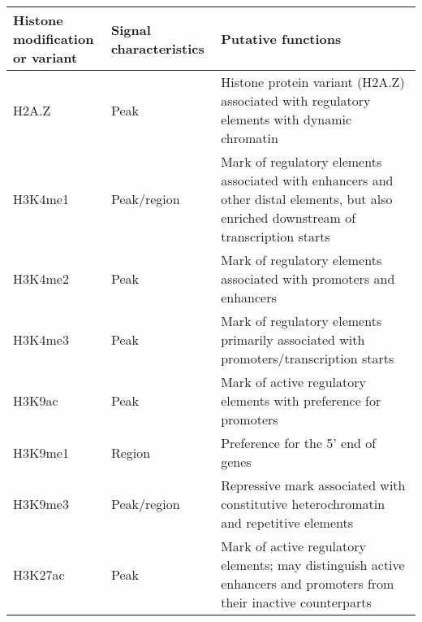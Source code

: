 \begin{table}[h]
   \footnotesize
   \begin{tabular}{l l p{5cm}}
\pbox[b]{20cm}{ \textbf{Histone modification} \\ \textbf{or variant} } & \textbf{Signal characteristics} & \textbf{Putative functions}                                                                                         \\ \hline
H2A.Z                           & Peak                   & Histone protein variant (H2A.Z) associated with regulatory elements with dynamic chromatin                                            \\ \hline
H3K4me1                         & Peak/region            & Mark of regulatory elements associated with enhancers and other distal elements, but also enriched downstream of transcription starts \\ \hline
H3K4me2                         & Peak                   & Mark of regulatory elements associated with promoters and enhancers                                                                   \\ \hline
H3K4me3                         & Peak                   & Mark of regulatory elements primarily associated with promoters/transcription starts                                                  \\ \hline
H3K9ac                          & Peak                   & Mark of active regulatory elements with preference for promoters                                                                      \\ \hline
H3K9me1                         & Region                 & Preference for the 5' end of genes                                                                                                    \\ \hline
H3K9me3                         & Peak/region            & Repressive mark associated with constitutive heterochromatin and repetitive elements                                                  \\ \hline
H3K27ac                         & Peak                   & Mark of active regulatory elements; may distinguish active enhancers and promoters from their inactive counterparts                   \\ \hline

\end{tabular}
\end{table}
